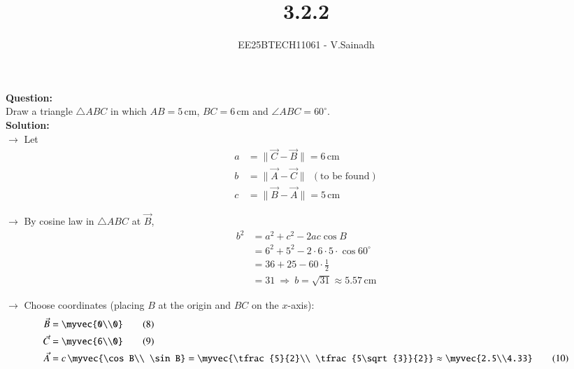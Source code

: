 \documentclass[journal]{IEEEtran}
\begin{document}

\vspace{3cm}

\title{3.2.2}
\author{EE25BTECH11061 - V.Sainadh}

\maketitle
{\let\newpage\relax\maketitle}
\renewcommand{\thefigure}{\theenumi}
\renewcommand{\thetable}{\theenumi}
\setlength{\intextsep}{10pt}

\textbf{Question:}\\
Draw a triangle $\triangle ABC$ in which $AB=5\,\text{cm}$, $BC=6\,\text{cm}$ and $\angle ABC=60^\circ$.\\[2pt]

\textbf{Solution:}\\
$\rightarrow$ Let
\begin{align}
a &= \|\vec{C}-\vec{B}\| = 6\,\text{cm} \tag{1}\\
b &= \|\vec{A}-\vec{C}\| \ \ (\text{to be found}) \tag{2}\\
c &= \|\vec{B}-\vec{A}\| = 5\,\text{cm} \tag{3}
\end{align}

$\rightarrow$ By cosine law in $\triangle ABC$ at $\vec{B}$,
\begin{align}
b^{2} &= a^{2}+c^{2}-2ac\cos B \tag{4}\\
      &= 6^{2}+5^{2}-2\cdot6\cdot5\cdot\cos60^\circ \tag{5}\\
      &= 36+25-60\cdot\frac12 \tag{6}\\
      &= 31 \ \Rightarrow\ b=\sqrt{31}\approx 5.57\,\text{cm} \tag{7}
\end{align}

$\rightarrow$ Choose coordinates (placing $B$ at the origin and $BC$ on the $x$-axis):
\begin{align}
\vec{B} &= \myvec{0\\0} \tag{8}\\
\vec{C} &= \myvec{6\\0} \tag{9}\\
\vec{A} &= c\,\myvec{\cos B\\ \sin B}
       = \myvec{\tfrac{5}{2}\\ \tfrac{5\sqrt{3}}{2}}
       \approx \myvec{2.5\\4.33} \tag{10}
\end{align}
\end{document}
